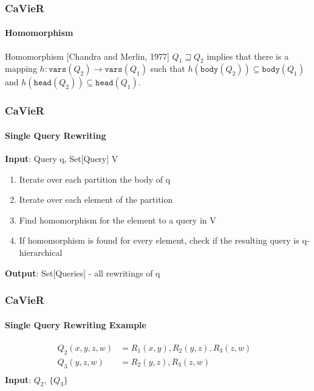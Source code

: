 \documentclass[
	11pt, %
]{beamer}
\begin{document}
\begin{frame}
	\frametitle{CaVieR}
	\framesubtitle{Homomorphism}
	\begin{block}{Homomorphism [Chandra and Merlin, 1977]}
		$Q_1 \sqsupseteq Q_2$ implies that there is a mapping $h: \texttt{vars}(Q_2) \rightarrow \texttt{vars}(Q_1)$ such that $h(\texttt{body}(Q_2)) \subseteq \texttt{body}(Q_1)$ and $h(\texttt{head}(Q_2)) \subseteq \texttt{head}(Q_1)$. 
	\end{block}
\end{frame}

\begin{frame}
	\frametitle{CaVieR}
	\framesubtitle{Single Query Rewriting}
	\textbf{Input}: Query q, Set[Query] V
	\begin{enumerate}
		\item Iterate over each partition the body of q
		\item Iterate over each element of the partition
		\item Find homomorphism for the element to a query in V
		\item If homomorphism is found for every element, check if the resulting query is q-hierarchical
	\end{enumerate}
	\textbf{Output}: Set[Queries] - all rewritings of q
\end{frame}


\begin{frame}
	\frametitle{CaVieR}
	\framesubtitle{Single Query Rewriting Example}
	\begin{align*}
		Q_2(x,y,z,w) &= R_1(x,y), R_2(y,z), R_3(z,w) &\\
		Q_3(y,z,w) &= R_2(y,z), R_3(z,w)&\\
	\end{align*}
	\textbf{Input}: $Q_2$, $\{Q_3\}$
	\vspace{4cm}
\end{frame}
\end{document}
